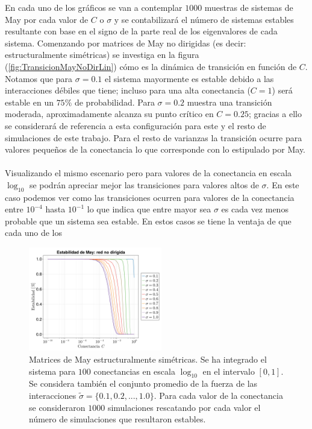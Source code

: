 En cada uno de los gráficos se van a contemplar $1000$ muestras de sistemas de May por cada valor de $C$ o $\sigma$ y se contabilizará el número de sistemas estables resultante con base en el signo de la parte real de los eigenvalores de cada sistema. Comenzando por matrices de May no dirigidas (es decir: estructuralmente simétricas) se investiga en la figura (\ref{fig:TransicionMayNoDirLin}) cómo es la dinámica de transición en función de $C$. Notamos que para $\sigma=0.1$ el sistema mayormente es estable debido a las interacciones débiles que tiene; incluso para una alta conectancia ($C=1$) será estable en un $75\%$ de probabilidad. Para $\sigma=0.2$ muestra una transición moderada, aproximadamente alcanza su punto crítico en $C=0.25$; gracias a ello se considerará de referencia a esta configuración para este y el resto de simulaciones de este trabajo. Para el resto de varianzas la transición ocurre para valores pequeños de la conectancia lo que corresponde con lo estipulado por May.\\
\\
Visualizando el mismo escenario pero para valores de la conectancia en escala $\log_{10}$ se podrán apreciar mejor las transiciones para valores altos de $\sigma$. En este caso podemos ver como las transiciones ocurren para valores de la conectancia entre $10^{-4}$ hasta $10^{-1}$ lo que indica que entre mayor sea $\sigma$ es cada vez menos probable que un sistema sea estable. En estos casos se tiene la ventaja de que cada uno de los 
\begin{figure} \vspace{-30pt} \begin{center}
		\includegraphics[width=0.52\textwidth]{../Imagenes/TransicionMayNoDirLog} 
	\end{center} 
	\vspace{-20pt} 
	\caption{Matrices de May estructuralmente simétricas. Se ha integrado el sistema para $100$ conectancias en escala $\log_{10}$ en el intervalo $[0,1]$. Se considera también el conjunto promedio de la fuerza de las interacciones $\tilde{\sigma}=\{0.1,0.2,...,1.0\}$. Para cada valor de la conectancia se consideraron $1000$ simulaciones rescatando por cada valor el número de simulaciones que resultaron estables.} 
	\vspace{-10pt}
	\label{fig:TransicionMayNoDirLog}
\end{figure} 

